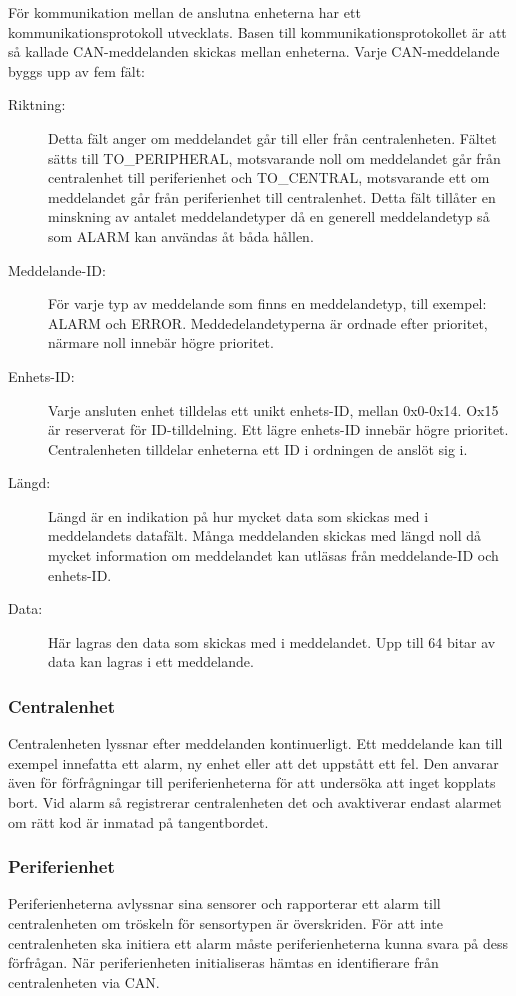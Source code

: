 \documentclass[a4paper]{article}
\begin{document}
För kommunikation mellan de anslutna enheterna har ett kommunikationsprotokoll utvecklats. Basen till kommunikationsprotokollet är att så kallade CAN-meddelanden skickas mellan enheterna. Varje CAN-meddelande byggs upp av fem fält:
\begin{description}
    \item[Riktning:] Detta fält anger om meddelandet går till eller från centralenheten.
    Fältet sätts till TO\_PERIPHERAL, motsvarande noll om meddelandet går från centralenhet till periferienhet och TO\_CENTRAL, motsvarande ett om meddelandet går från periferienhet till centralenhet. 
    Detta fält tillåter en minskning av antalet meddelandetyper då en generell meddelandetyp så som ALARM kan användas åt båda hållen.

    \item[Meddelande-ID:] För varje typ av meddelande som finns en meddelandetyp, till exempel: ALARM och ERROR.
    Meddedelandetyperna är ordnade efter prioritet, närmare noll innebär högre prioritet.
    
    \item[Enhets-ID:] Varje ansluten enhet tilldelas ett unikt enhets-ID, mellan 0x0-0x14. Ox15 är reserverat för ID-tilldelning. Ett lägre enhets-ID innebär högre prioritet.
    Centralenheten tilldelar enheterna ett ID i ordningen de anslöt sig i.
    
    \item[Längd:] Längd är en indikation på hur mycket data som skickas med i meddelandets datafält.
    Många meddelanden skickas med längd noll då mycket information om meddelandet kan utläsas från meddelande-ID och enhets-ID.

    \item[Data:] Här lagras den data som skickas med i meddelandet. Upp till 64 bitar av data kan lagras i ett meddelande.
\end{description}

\subsubsection{Centralenhet}
Centralenheten lyssnar efter meddelanden kontinuerligt.
Ett meddelande kan till exempel innefatta ett alarm, ny enhet eller att det uppstått ett fel.
Den anvarar även för förfrågningar till periferienheterna för att undersöka att inget kopplats bort.
Vid alarm så registrerar centralenheten det och avaktiverar endast alarmet om rätt kod är inmatad på tangentbordet.

\subsubsection{Periferienhet}
Periferienheterna avlyssnar sina sensorer och rapporterar ett alarm till centralenheten om tröskeln för sensortypen är överskriden.
För att inte centralenheten ska initiera ett alarm måste periferienheterna kunna svara på dess förfrågan.
När periferienheten initialiseras hämtas en identifierare från centralenheten via CAN.
\end{document}
